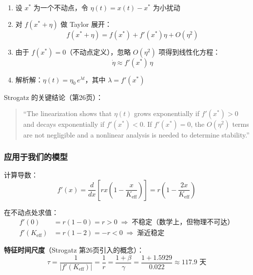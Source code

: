 \documentclass[12pt,a4paper]{article}
\begin{document}
\begin{enumerate}[label=(\arabic*)]
  \item 设 $x^*$ 为一个不动点，令 $\eta(t) = x(t) - x^*$ 为小扰动
  \item 对 $f(x^* + \eta)$ 做 Taylor 展开：
        \begin{equation}
        f(x^* + \eta) = f(x^*) + f'(x^*)\eta + O(\eta^2)
        \end{equation}
  \item 由于 $f(x^*) = 0$（不动点定义），忽略 $O(\eta^2)$ 项得到线性化方程：
        \begin{equation}
        \dot{\eta} \approx f'(x^*)\,\eta
        \end{equation}
  \item 解析解：$\eta(t) = \eta_0 \, e^{\lambda t}$，其中 $\lambda = f'(x^*)$
\end{enumerate}

Strogatz 的关键结论（第26页）：
\begin{quote}
\small
``The linearization shows that $\eta(t)$ grows exponentially if $f'(x^*) > 0$ and decays
exponentially if $f'(x^*) < 0$. If $f'(x^*) = 0$, the $O(\eta^2)$ terms are not negligible
and a nonlinear analysis is needed to determine stability.''
\end{quote}

\subsubsection{应用于我们的模型}

计算导数：
\begin{equation}
f'(x) = \frac{d}{dx}\left[ r x \left(1 - \frac{x}{K_{\text{eff}}}\right) \right]
       = r\left(1 - \frac{2x}{K_{\text{eff}}}\right)
\end{equation}

在不动点处求值：
\begin{align}
f'(0)      &= r\left(1 - 0\right) = r > 0
            \;\Rightarrow\; \text{不稳定（数学上，但物理不可达）} \\[4pt]
f'(K_{\text{eff}}) &= r\left(1 - 2\right) = -r < 0
            \;\Rightarrow\; \textbf{渐近稳定}
\end{align}

\textbf{特征时间尺度}（Strogatz 第26页引入的概念）：
\begin{equation}
\tau = \frac{1}{|f'(K_{\text{eff}})|} = \frac{1}{r} = \frac{1+\beta}{\gamma}
      = \frac{1+1.5929}{0.022} \approx 117.9 \text{ 天}
\end{equation}
\end{document}
